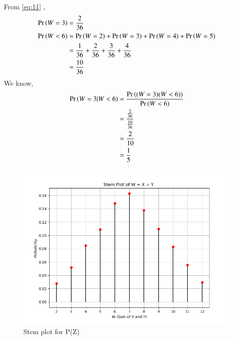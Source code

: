 \documentclass[journal,12pt,onecolumn]{IEEEtran}
\theoremstyle{remark}
\begin{document}
From \eqref{eq:11} ,
\begin{align}
\Pr\left(W=3\right) &= \frac{2}{36}\\
\Pr\left(W<6\right) &= \Pr\left(W=2\right) + \Pr\left(W=3\right) +\Pr\left(W=4\right)+\Pr\left(W=5\right)\\
&= \frac{1}{36} + \frac{2}{36} + \frac{3}{36} + \frac{4}{36}\\
&=\frac{10}{36}
\end{align}
We know,
\begin{align}
\Pr\left(W =3 | W<6\right)&= \frac{\Pr\left((W=3)(W<6)\right)}{\Pr\left(W<6\right)}\\
&= \frac{\frac{2}{36}}{\frac{10}{36}}\\
&= \frac{2}{10}\\
&= \frac{1}{5}
\end{align}
\begin{figure}
\includegraphics[width=\columnwidth]{exemplar/12/13/3/82/figs/Z.png}
\caption{Stem plot for P(Z)}
\label{fig:exemplar/12/13/3/82/Z/}
\end{figure}

%
%
		
\end{document}
